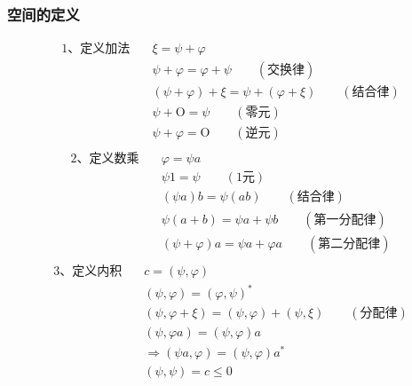 \begin{frame} [allowframebreaks=]
    \frametitle{空间的定义}
    \begin{equation*}
        \begin{split}
            \text{1、定义加法} \quad  &\xi=\psi+\varphi\\
            &\psi+\varphi=\varphi+\psi \qquad (\text{交换律})\\
            &(\psi+\varphi)+\xi=\psi+(\varphi+\xi) \qquad (\text{结合律})\\
            &\psi+\text{O}= \psi \qquad (\text{零元})\\
            &\psi+\varphi= \text{O} \qquad (\text{逆元})\\
        \end{split}  
    \end{equation*}
    \begin{equation*}
        \begin{split}
            \text{2、定义数乘} \quad &\varphi=\psi a\\
            &\psi 1= \psi \qquad (\text{1元})\\
            &(\psi a)b=\psi (ab) \qquad (\text{结合律})\\
            &\psi(a+b)= \psi a+ \psi b \qquad (\text{第一分配律})\\
            &(\psi+\varphi) a= \psi a +\varphi a \qquad (\text{第二分配律})\\
        \end{split}  
    \end{equation*}
    \begin{equation*}
        \begin{split}
            \text{3、定义内积} \quad &c=(\psi, \varphi)\\
            &(\psi, \varphi)= (\varphi,\psi)^* \\
            &(\psi, \varphi+\xi)= (\psi, \varphi) + (\psi, \xi)\qquad (\text{分配律})\\
            &(\psi, \varphi a)= (\psi, \varphi )a \\
            &\Rightarrow (\psi a, \varphi )= (\psi, \varphi )a^* \\
            &(\psi,\psi)= c\le 0\\
        \end{split}  
    \end{equation*}
\end{frame} 

